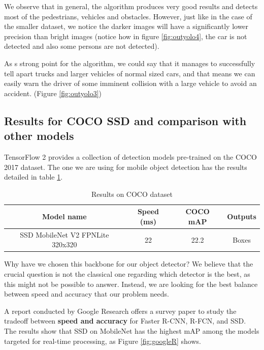 \documentclass[runningheads,a4paper,11pt]{report}
\begin{document}
 We observe that in general, the algorithm produces very good results and detects most of the pedestrians, vehicles and obstacles.
However, just like in the case of the smaller dataset, we notice the darker images will have a significantly lower precision than bright images (notice how in figure \ref{fig:outyolo4}, the car is not detected and also some persons are not detected).

As s strong point for the algorithm, we could say that it manages to successfully tell apart trucks and larger vehicles of normal sized cars, and that means we can easily warn the driver of some imminent collision with a large vehicle to avoid an accident. (Figure \ref{fig:outyolo3})

\subsection{Results for COCO SSD and comparison with other models}
\label{subsection:results_coco}

TensorFlow 2 provides a collection of detection models pre-trained on the COCO 2017 dataset. The one we are using for mobile object detection has the results detailed in table \ref{tab:tabl}.

\begin{table}
\centering
\begin{tabular}{||c c c c||} 
 \hline
 Model name & Speed (ms) & COCO mAP & Outputs \\ [0.5ex] 
 \hline\hline
 SSD MobileNet V2 FPNLite 320x320 & 22 & 22.2 & Boxes \\ 
 \hline
\end{tabular}
 \caption{Results on COCO dataset}\label{tab:tabl}

\end{table}




Why have we chosen this backbone for our object detector? We believe that the crucial question is not the classical one regarding which detector is the best, as this might not be possible to answer. Instead, we are looking for the best balance between speed and accuracy that our problem needs.  

A report conducted by Google Research offers a survey paper to study the tradeoff between \textbf{speed and accuracy} for Faster R-CNN, R-FCN, and SSD. The results show that SSD on MobileNet has the highest mAP among the models targeted for real-time processing, as Figure \ref{fig:googleR} shows.
\end{document}
